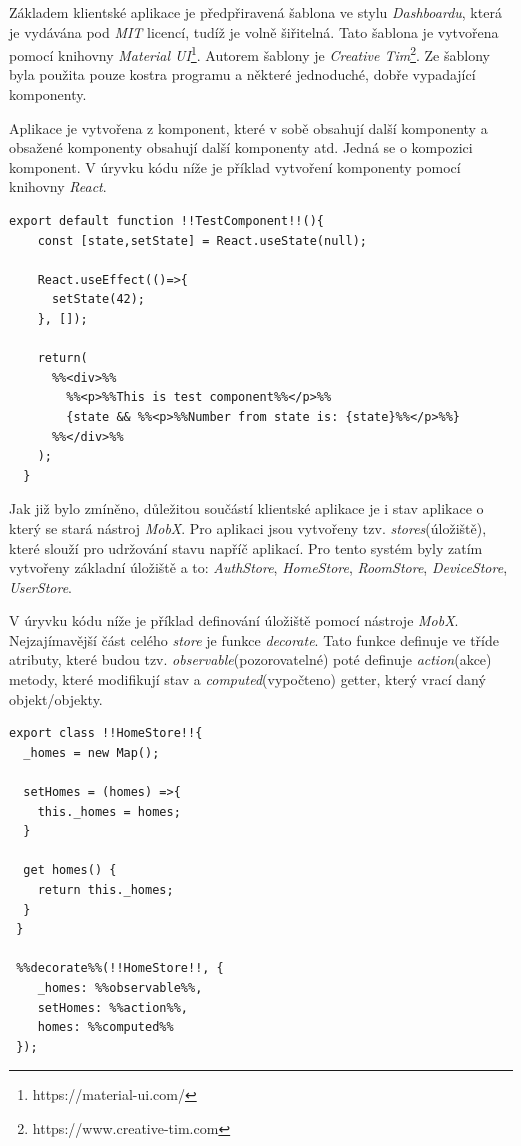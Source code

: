 Základem klientské aplikace je předpřiravená šablona ve stylu \emph{Dashboardu}, která je vydávána pod \emph{MIT} licencí, tudíž je volně šiřitelná.
Tato šablona je vytvořena pomocí knihovny \emph{Material UI}\footnote{https://material-ui.com/}. Autorem šablony je \emph{Creative Tim}\footnote{https://www.creative-tim.com}.
Ze šablony byla použita pouze kostra programu a některé jednoduché, dobře vypadající komponenty.

Aplikace je vytvořena z komponent, které v sobě obsahují další komponenty a obsažené komponenty obsahují další komponenty atd.
Jedná se o kompozici komponent.
V úryvku kódu níže je příklad vytvoření komponenty pomocí knihovny \emph{React}.

\begin{lstlisting}[style=JavaScriptStyle,caption={Ukázka asociace 1:N (domácnost:místnosti)}]
  export default function !!TestComponent!!(){
    const [state,setState] = React.useState(null);

    React.useEffect(()=>{
      setState(42);
    }, []);
    
    return(
      %%<div>%%
        %%<p>%%This is test component%%</p>%%
        {state && %%<p>%%Number from state is: {state}%%</p>%%}
      %%</div>%%
    );
  }
\end{lstlisting}

Jak již bylo zmíněno, důležitou součástí klientské aplikace je i stav aplikace o který se stará nástroj \emph{MobX}.
Pro aplikaci jsou vytvořeny tzv. \emph{stores}(úložiště), které slouží pro udržování stavu napříč aplikací.
Pro tento systém byly zatím vytvořeny základní úložiště a to: \emph{AuthStore}, \emph{HomeStore}, \emph{RoomStore}, \emph{DeviceStore}, \emph{UserStore}.

\newpage
V úryvku kódu níže je příklad definování úložiště pomocí nástroje \emph{MobX}.
Nejzajímavější část celého \emph{store} je funkce \emph{decorate}.
Tato funkce definuje ve tříde atributy, které budou tzv. \emph{observable}(pozorovatelné) poté definuje \emph{action}(akce) metody,
které modifikují stav a \emph{computed}(vypočteno) getter, který vrací daný objekt/objekty.

\begin{lstlisting}[style=JavaScriptStyle,caption={Ukázka asociace 1:N (domácnost:místnosti)}]
 export class !!HomeStore!!{
  _homes = new Map();

  setHomes = (homes) =>{
    this._homes = homes;
  }

  get homes() {
    return this._homes;
  }
 }

 %%decorate%%(!!HomeStore!!, {
    _homes: %%observable%%,
    setHomes: %%action%%,
    homes: %%computed%%
 });
\end{lstlisting}

